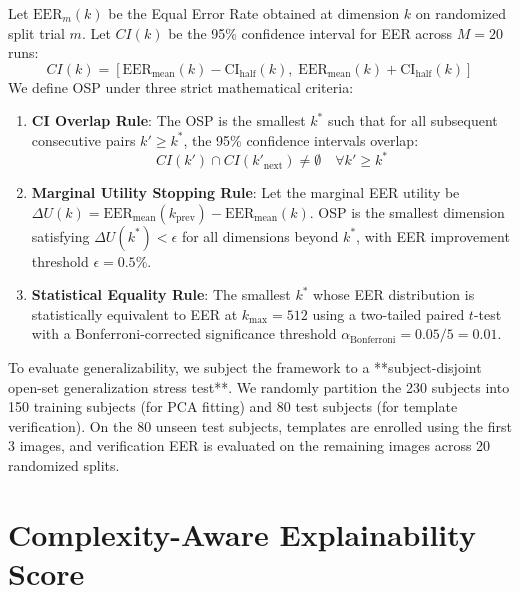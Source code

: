 \documentclass[conference]{IEEEtran}
\begin{document}
Let $\text{EER}_m(k)$ be the Equal Error Rate obtained at dimension $k$ on randomized split trial $m$. Let $CI(k)$ be the 95\% confidence interval for EER across $M=20$ runs:
\begin{equation}
    CI(k) = [ \text{EER}_{\text{mean}}(k) - \text{CI}_{\text{half}}(k), \; \text{EER}_{\text{mean}}(k) + \text{CI}_{\text{half}}(k) ]
    \label{eq:ci_def}
\end{equation}
We define OSP under three strict mathematical criteria:
\begin{enumerate}
    \item \textbf{CI Overlap Rule}: The OSP is the smallest $k^*$ such that for all subsequent consecutive pairs $k' \ge k^*$, the 95\% confidence intervals overlap:
    \begin{equation}
        CI(k') \cap CI(k'_{\text{next}}) \neq \emptyset \quad \forall k' \ge k^*
        \label{eq:ci_overlap}
    \end{equation}
    \item \textbf{Marginal Utility Stopping Rule}: Let the marginal EER utility be $\Delta U(k) = \text{EER}_{\text{mean}}(k_{\text{prev}}) - \text{EER}_{\text{mean}}(k)$. OSP is the smallest dimension satisfying $\Delta U(k^*) < \epsilon$ for all dimensions beyond $k^*$, with EER improvement threshold $\epsilon = 0.5\%$.
    \item \textbf{Statistical Equality Rule}: The smallest $k^*$ whose EER distribution is statistically equivalent to EER at $k_{\max} = 512$ using a two-tailed paired $t$-test with a Bonferroni-corrected significance threshold $\alpha_{\text{Bonferroni}} = 0.05 / 5 = 0.01$.
\end{enumerate}

To evaluate generalizability, we subject the framework to a **subject-disjoint open-set generalization stress test**. We randomly partition the 230 subjects into 150 training subjects (for PCA fitting) and 80 test subjects (for template verification). On the 80 unseen test subjects, templates are enrolled using the first 3 images, and verification EER is evaluated on the remaining images across 20 randomized splits.

\section{Complexity-Aware Explainability Score}
\label{sec:caes}
\end{document}
